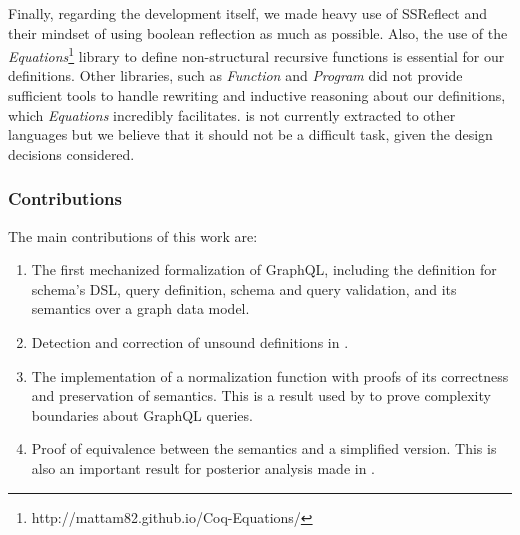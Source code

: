 
Finally, regarding the development itself, we made heavy use of SSReflect and their mindset of using boolean reflection as much as possible. Also, the use of the \textit{Equations}\footnote{http://mattam82.github.io/Coq-Equations/} library to define non-structural recursive functions is essential for our definitions. Other libraries, such as \textit{Function} and \textit{Program} did not provide sufficient tools to handle rewriting and inductive reasoning about our definitions, which \textit{Equations} incredibly facilitates. \coql{} is not currently extracted to other languages but we believe that it should not be a difficult task, given the design decisions considered.


\subsubsection*{Contributions}
The main contributions of this work are:
\begin{enumerate}
    \item The first mechanized formalization of GraphQL, including the definition for schema's DSL, query definition, schema and query validation, and its semantics over a graph data model.
    \item Detection and correction of unsound definitions in \HP{}.
    \item The implementation of a normalization function with proofs of its correctness and preservation of semantics. This is a result used by \HP{} to prove complexity boundaries about GraphQL queries.
    \item Proof of equivalence between the semantics and a simplified version. This is also an important result for posterior analysis made in \HP{}.

\end{enumerate}

